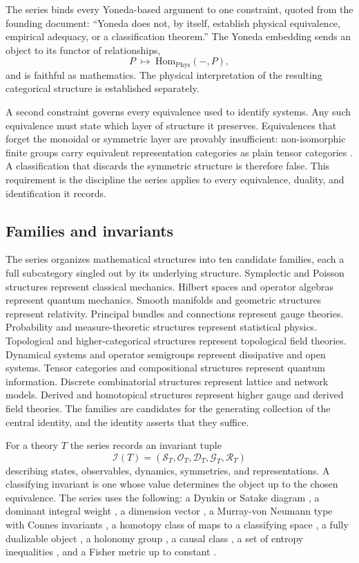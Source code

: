 \documentclass[11pt,letterpaper]{article}
\theoremstyle{definition}
\theoremstyle{remark}
\begin{document}
The series binds every Yoneda-based argument to one constraint, quoted from the founding document: ``Yoneda does not, by itself, establish physical equivalence, empirical adequacy, or a classification theorem.'' The Yoneda embedding sends an object to its functor of relationships,
\[
  P \;\longmapsto\; \mathrm{Hom}_{\mathrm{Phys}}(-, P),
\]
and is faithful as mathematics. The physical interpretation of the resulting categorical structure is established separately.

A second constraint governs every equivalence used to identify systems. Any such equivalence must state which layer of structure it preserves. Equivalences that forget the monoidal or symmetric layer are provably insufficient: non-isomorphic finite groups carry equivalent representation categories as plain tensor categories \cite{corpus-74}. A classification that discards the symmetric structure is therefore false. This requirement is the discipline the series applies to every equivalence, duality, and identification it records.

\subsection{Families and invariants}

The series organizes mathematical structures into ten candidate families, each a full subcategory singled out by its underlying structure. Symplectic and Poisson structures represent classical mechanics. Hilbert spaces and operator algebras represent quantum mechanics. Smooth manifolds and geometric structures represent relativity. Principal bundles and connections represent gauge theories. Probability and measure-theoretic structures represent statistical physics. Topological and higher-categorical structures represent topological field theories. Dynamical systems and operator semigroups represent dissipative and open systems. Tensor categories and compositional structures represent quantum information. Discrete combinatorial structures represent lattice and network models. Derived and homotopical structures represent higher gauge and derived field theories. The families are candidates for the generating collection of the central identity, and the identity asserts that they suffice.

For a theory $T$ the series records an invariant tuple
\[
  \mathcal{I}(T) = (\mathcal{S}_T, \mathcal{O}_T, \mathcal{D}_T, \mathcal{G}_T, \mathcal{R}_T)
\]
describing states, observables, dynamics, symmetries, and representations. A classifying invariant is one whose value determines the object up to the chosen equivalence. The series uses the following: a Dynkin or Satake diagram \cite{corpus-4}, a dominant integral weight \cite{corpus-5}, a dimension vector \cite{corpus-9}, a Murray-von Neumann type with Connes invariants \cite{corpus-62,corpus-64}, a homotopy class of maps to a classifying space \cite{corpus-17,corpus-18}, a fully dualizable object \cite{corpus-34,corpus-35}, a holonomy group \cite{corpus-51}, a causal class \cite{corpus-50}, a set of entropy inequalities \cite{corpus-47}, and a Fisher metric up to constant \cite{corpus-52}.
\end{document}

